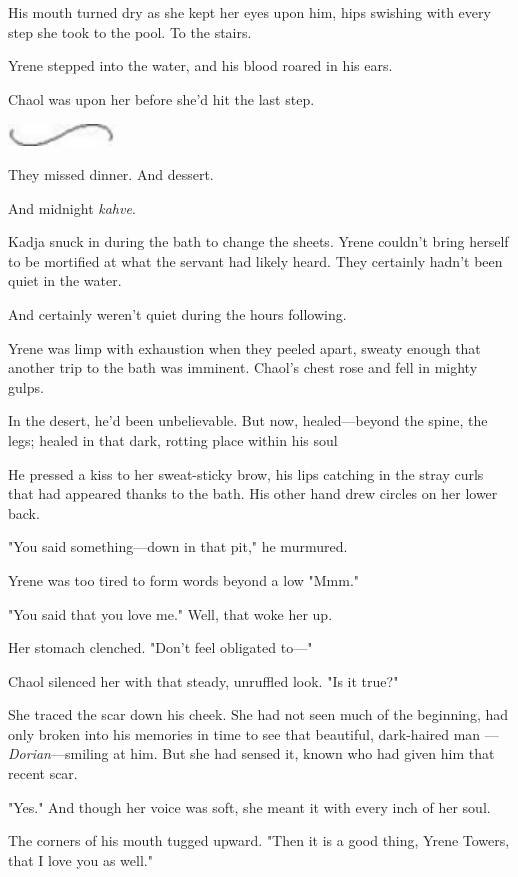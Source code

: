 His mouth turned dry as she kept her eyes upon him, hips swishing with every step she took to the pool. To the stairs.

Yrene stepped into the water, and his blood roared in his ears.

Chaol was upon her before she'd hit the last step.

\includegraphics[width=1.12in,height=0.24in]{images/seperator}

They missed dinner. And dessert.

And midnight \emph{kahve}.

Kadja snuck in during the bath to change the sheets. Yrene couldn't bring herself to be mortified at what the servant had likely heard. They certainly hadn't been quiet in the water.

And certainly weren't quiet during the hours following.

Yrene was limp with exhaustion when they peeled apart, sweaty enough that another trip to the bath was imminent. Chaol's chest rose and fell in mighty gulps.

In the desert, he'd been unbelievable. But now, healed---beyond the spine, the legs; healed in that dark, rotting place within his soul


He pressed a kiss to her sweat-sticky brow, his lips catching in the stray curls that had appeared thanks to the bath. His other hand drew circles on her lower back.

"You said something---down in that pit," he murmured.

Yrene was too tired to form words beyond a low "Mmm."

"You said that you love me." Well, that woke her up.

Her stomach clenched. "Don't feel obligated to---"

Chaol silenced her with that steady, unruffled look. "Is it true?"

She traced the scar down his cheek. She had not seen much of the beginning, had only broken into his memories in time to see that beautiful, dark-haired man ---\emph{Dorian}---smiling at him. But she had sensed it, known who had given him that recent scar.

"Yes." And though her voice was soft, she meant it with every inch of her soul.

The corners of his mouth tugged upward. "Then it is a good thing, Yrene Towers, that I love you as well."


